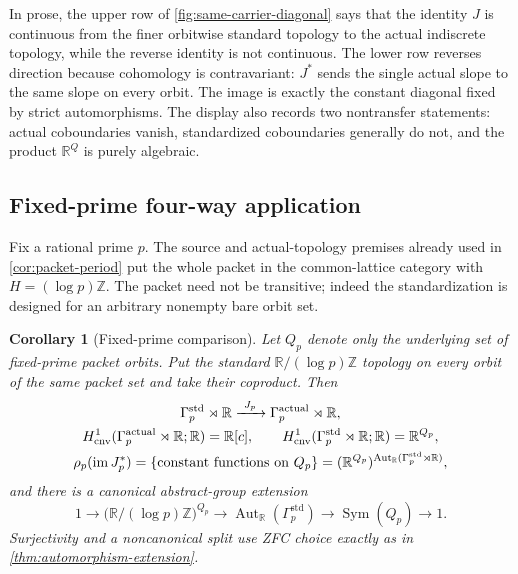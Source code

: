 \documentclass[11pt]{article}
\newtheorem{corollary}[theorem]{Corollary}
\theoremstyle{definition}
\newcommand{\R}{\mathbb R}
\newcommand{\Z}{\mathbb Z}
\newcommand{\Hcnv}{H_{\mathrm{cnv}}}
\newcommand{\AutR}{\operatorname{Aut}_{\R}}
\newcommand{\Sym}{\operatorname{Sym}}
\newcommand{\im}{\operatorname{im}}
\begin{document}
In prose, the upper row of \cref{fig:same-carrier-diagonal} says that the
identity $J$ is continuous from the finer orbitwise standard topology to the
actual indiscrete topology, while the reverse identity is not continuous.
The lower row reverses direction because cohomology is contravariant:
$J^*$ sends the single actual slope to the same slope on every orbit.  The
image is exactly the constant diagonal fixed by strict automorphisms.  The
display also records two nontransfer statements: actual coboundaries vanish,
standardized coboundaries generally do not, and the product $\R^Q$ is purely
algebraic.

\FloatBarrier

\subsection{Fixed-prime four-way application}
\label{sec:four-way}

Fix a rational prime $p$.  The source and actual-topology premises already
used in \cref{cor:packet-period} put the whole packet in the common-lattice
category with $H=(\log p)\Z$.  The packet need not be transitive; indeed the
standardization is designed for an arbitrary nonempty bare orbit set.

\begin{corollary}[Fixed-prime comparison]
\label{cor:packet-comparison}
Let $Q_p$ denote only the underlying set of fixed-prime packet orbits.  Put
the standard $\R/(\log p)\Z$ topology on every orbit of the same packet set
and take their coproduct.  Then
\begin{gather}
\label{eq:packet-comparison}
 \Gamma_p^{\mathrm{std}}\rtimes\R
 \xrightarrow{\ J_p\ }
 \Gamma_p^{\mathrm{actual}}\rtimes\R,\\
 \Hcnv^1(\Gamma_p^{\mathrm{actual}}\rtimes\R;\R)=\R[c],
 \qquad
 \Hcnv^1(\Gamma_p^{\mathrm{std}}\rtimes\R;\R)=\R^{Q_p},\notag\\
 \rho_p(\im J_p^*)
 =\{\text{constant functions on }Q_p\}
 =(\R^{Q_p})^{\AutR(\Gamma_p^{\mathrm{std}}\rtimes\R)},\notag
\end{gather}
and there is a canonical abstract-group extension
\begin{equation}
\label{eq:packet-automorphisms}
 1\longrightarrow
 \bigl(\R/(\log p)\Z\bigr)^{Q_p}
 \longrightarrow\AutR(\Gamma_p^{\mathrm{std}})
 \longrightarrow\Sym(Q_p)\longrightarrow1.
\end{equation}
Surjectivity and a noncanonical split use ZFC choice exactly as in
\cref{thm:automorphism-extension}.
\end{corollary}
\end{document}
